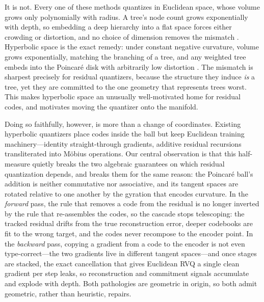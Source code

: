 \documentclass[12pt]{report}
\begin{document}
It is not. Every one of these methods quantizes in Euclidean space, whose volume grows only
polynomially with radius. A tree's node count grows exponentially with depth, so embedding
a deep hierarchy into a flat space forces either crowding or distortion, and no choice of
dimension removes the mismatch \cite{sala2018representation}. Hyperbolic space is the exact
remedy: under constant negative curvature, volume grows exponentially, matching the
branching of a tree, and any weighted tree embeds into the Poincar\'e disk with arbitrarily
low distortion \cite{nickel2017poincare,sala2018representation}. The mismatch is sharpest
precisely for residual quantizers, because the structure they induce \emph{is} a tree, yet
they are committed to the one geometry that represents trees worst. This makes hyperbolic
space an unusually well-motivated home for residual codes, and motivates moving the
quantizer onto the manifold.

Doing so faithfully, however, is more than a change of coordinates. Existing hyperbolic
quantizers \cite{hrqvae,hyprqvae_recsys,hypervq} place codes inside the ball but keep
Euclidean training machinery---identity straight-through gradients, additive residual
recursions transliterated into M\"obius operations. Our central observation is that this
half-measure quietly breaks the two algebraic guarantees on which residual quantization
depends, and breaks them for the same reason: the Poincar\'e ball's addition is neither
commutative nor associative, and its tangent spaces are rotated relative to one another by
the gyration that encodes curvature. In the \emph{forward} pass, the rule that removes a
code from the residual is no longer inverted by the rule that re-assembles the codes, so
the cascade stops telescoping: the tracked residual drifts from the true reconstruction
error, deeper codebooks are fit to the wrong target, and the codes never recompose to the
encoder point. In the \emph{backward} pass, copying a gradient from a code to the encoder is
not even type-correct---the two gradients live in different tangent spaces---and once stages
are stacked, the exact cancellation that gives Euclidean RVQ a single clean gradient per
step leaks, so reconstruction and commitment signals accumulate and explode with depth.
Both pathologies are geometric in origin, so both admit geometric, rather than heuristic,
repairs.
\end{document}
